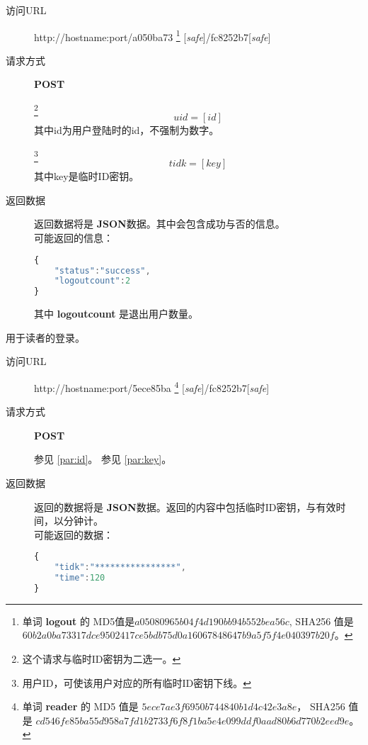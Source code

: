 \documentclass[UTF8]{ctexart}
\def\safe{[\textit{safe}]}
\def\POST{\textbf{POST}}
\def\bfJSON{\textbf{JSON}}
\begin{document}
    \begin{description}
        \item[访问URL] http://hostname:port/a050ba73
        \footnote{
            单词 \textbf{logout} 的
            MD5值是$a05080965b04f4d190bb94b552bea56c $,
            SHA256 值是
            $60b2a0ba73317dce9502417ce5bdb75d0a16067848647b9a5f5f4e040397b20f$。
        }
        [\textit{safe}]/fc8252b7[\textit{safe}]
        
        \item[请求方式] \textbf{POST}
        
        \label{par:logout:id}
        \footnote{这个请求与临时ID密钥为二选一。}
        $$uid=[id]$$
        其中id为用户登陆时的id，不强制为数字。
        
        \label{par:logout:tidk}
        \footnote{用户ID，可使该用户对应的所有临时ID密钥下线。}
        $$tidk=[key]$$
        其中key是临时ID密钥。
        
        \item[返回数据] 返回数据将是 \bfJSON 数据。其中会包含成功与否的信息。
        \\可能返回的信息：
        \begin{lstlisting}[language=JavaScript]
{
    "status":"success",
    "logoutcount":2
}
        \end{lstlisting}\label{par:logout:example}
        其中 \textbf{logoutcount} 是退出用户数量。
    \end{description}
    
    
    
    
    
    
		用于读者的登录。
		\begin{description}
            
		\item[访问URL] http://hostname:port/5ece85ba
        \footnote{单词 \textbf{reader} 的
            MD5 值是 
            $5ece7ae3f6950b744840b1d4c42e3a8e$，
            SHA256 值是
            $cd546fe85ba55d958a7fd1b2733f6f8f1ba5e4e099ddf0aad80b6d770b2eed9e$。
            }
        \safe/fc8252b7\safe
        
        \item[请求方式] \POST
        
         参见 \ref{par:id}。
         参见 \ref{par:key}。
        \item[返回数据] 返回的数据将是 \bfJSON 数据。返回的内容中包括临时ID密钥，与有效时间，以分钟计。
        \\可能返回的数据：
        \begin{lstlisting}[language=JavaScript]
{
    "tidk":"****************",
    "time":120
}
        \end{lstlisting}
		\end{description}
        
\end{document}
